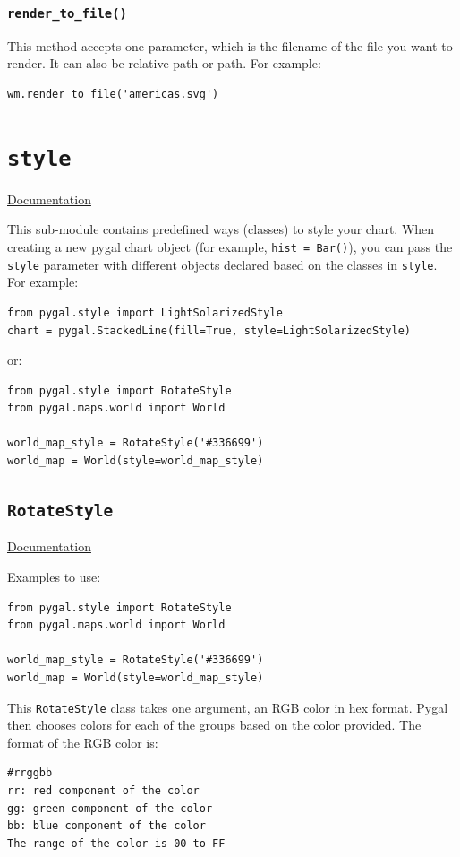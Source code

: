 \documentclass[12pt]{book}
\begin{document}
\subsubsection{\texttt{render\_to\_file()}}
\label{sec:org06441f2}
This method accepts one parameter, which is the filename of the file you want to render. It can also be relative path or path. For example:
\begin{verbatim}
wm.render_to_file('americas.svg')
\end{verbatim}

\section{\texttt{style}}
\label{sec:orgcb98e61}
\href{http://www.pygal.org/en/stable/documentation/styles.html}{Documentation}

This sub-module contains predefined ways (classes) to style your chart. When creating a new pygal chart object (for example, \texttt{hist = Bar()}), you can pass the \texttt{style} parameter with different objects declared based on the classes in \texttt{style}. For example:
\begin{verbatim}
from pygal.style import LightSolarizedStyle
chart = pygal.StackedLine(fill=True, style=LightSolarizedStyle)
\end{verbatim}
or:
\begin{verbatim}
from pygal.style import RotateStyle
from pygal.maps.world import World

world_map_style = RotateStyle('#336699')
world_map = World(style=world_map_style)
\end{verbatim}
\subsection{\texttt{RotateStyle}}
\label{sec:orgd9f17d8}
\href{http://www.pygal.org/en/stable/documentation/parametric\_styles.html\#rotate}{Documentation}

Examples to use:
\begin{verbatim}
from pygal.style import RotateStyle
from pygal.maps.world import World

world_map_style = RotateStyle('#336699')
world_map = World(style=world_map_style)
\end{verbatim}
This \texttt{RotateStyle} class takes one argument, an RGB color in hex format. Pygal then chooses colors for each of the groups based on the color provided. The format of the RGB color is:
\begin{verbatim}
#rrggbb
rr: red component of the color
gg: green component of the color
bb: blue component of the color
The range of the color is 00 to FF
\end{verbatim}
\end{document}
